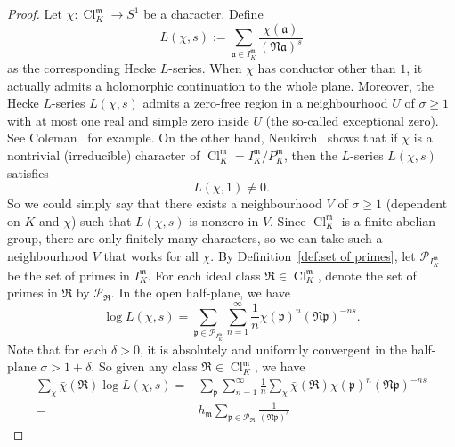 \documentclass{amsart}
\numberwithin{equation}{section}
\theoremstyle{plain}
\theoremstyle{definition}
\theoremstyle{remark}
\begin{document}
\begin{proof}
	Let $\chi:\operatorname{Cl}_K^{\mathfrak{m}}\to S^1$ be a character.
	Define
	\begin{equation*}
		L(\chi,s):=\sum_{\mathfrak{a}\in I^{\mathfrak{m}}_K}\frac{\chi(\mathfrak{a})}{(\mathfrak{N}\mathfrak{a})^s}
	\end{equation*}
	as the corresponding Hecke $L$-series.
	When $\chi$ has conductor other than $1$, it actually admits a holomorphic continuation to the whole plane.
	Moreover, the Hecke $L$-series $L(\chi,s)$ admits a zero-free region in a neighbourhood $U$ of $\sigma\geq1$ with at most one real and simple zero inside $U$ (the so-called exceptional zero).
	See Coleman~\cite{Coleman_1990} for example.
	On the other hand, Neukirch~\cite[VII.13.3]{neukirch2013algebraic} shows that if $\chi$ is a nontrivial (irreducible) character of $\operatorname{Cl}_K^{\mathfrak{m}}=I_K^{\mathfrak{m}}/P_K^{\mathfrak{m}}$, then the $L$-series $L(\chi,s)$ satisfies
	\begin{equation*}
		L(\chi,1)\neq0.
	\end{equation*}
	So we could simply say that there exists a neighbourhood $V$ of $\sigma\geq1$ (dependent on $K$ and $\chi$) such that $L(\chi,s)$ is nonzero in $V$.
	Since $\operatorname{Cl}_K^{\mathfrak{m}}$ is a finite abelian group, there are only finitely many characters, so we can take such a neighbourhood $V$ that works for all $\chi$.
    By Definition~\ref{def:set of primes}, let $\mathcal{P}_{I_K^{\mathfrak{m}}}$ be the set of primes in $I_K^{\mathfrak{m}}$.
	For each ideal class $\mathfrak{R}\in\operatorname{Cl}_K^{\mathfrak{m}}$, denote the set of primes in $\mathfrak{R}$ by $\mathcal{P}_{\mathfrak{R}}$.
	In the open half-plane, we have
	\begin{equation*}
		\log L(\chi,s)=\sum_{\mathfrak{p}\in\mathcal{P}_{I_K^{\mathfrak{m}}}}\sum_{n=1}^\infty\frac{1}{n}\chi(\mathfrak{p})^n(\mathfrak{N}\mathfrak{p})^{-ns}.
	\end{equation*}
	Note that for each $\delta>0$, it is absolutely and uniformly convergent in the half-plane $\sigma>1+\delta$.
	So given any class $\mathfrak{R}\in\operatorname{Cl}_K^{\mathfrak{m}}$, we have
	\begin{equation*}
		\begin{aligned}
			\sum_{\chi}\bar{\chi}(\mathfrak{R})\log L(\chi,s)
			=&\sum_{\mathfrak{p}}\sum_{n=1}^\infty\frac{1}{n}\sum_{\chi}\bar{\chi}(\mathfrak{R})\chi(\mathfrak{p})^n(\mathfrak{N}
			\mathfrak{p})^{-ns}
			\\
			=&h_{\mathfrak{m}}\sum_{\mathfrak{p}\in\mathcal{P}_{\mathfrak{R}}}\frac{1}{(\mathfrak{N}\mathfrak{p})^s}

\end{aligned}
\end{equation*}
\end{proof}
\end{document}
